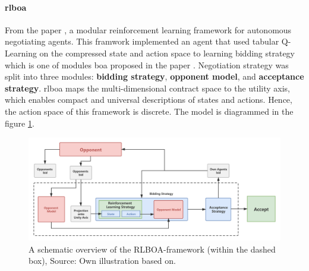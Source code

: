 \paragraph{\gls{rlboa}} From the paper \parencite{Bakker2019RLBOAAM}, a modular reinforcement learning framework for autonomous negotiating agents. This framwork implemented an agent that used tabular Q-Learning on the compressed state and action space to learning bidding strategy which is one of modules \gls{boa} proposed in the paper \parencite{Baarslag2014}. Negotiation strategy was split into three modules: \textbf{bidding strategy}, \textbf{opponent model}, and \textbf{acceptance strategy}. \gls{rlboa} maps the multi-dimensional contract space to the utility axis, which enables compact and universal descriptions of states and actions. Hence, the action space of this framework is discrete. The model is diagrammed in the figure \ref{fig:rlboa}.

\begin{figure}[htbp]
\centering
\includegraphics[width=1.0\textwidth]{./images/rlboa.png}
\caption{A schematic overview of the RLBOA-framework (within the dashed box), Source: Own illustration based
on\parencite{Bakker2019RLBOAAM}.}
\label{fig:rlboa}
\end{figure}


